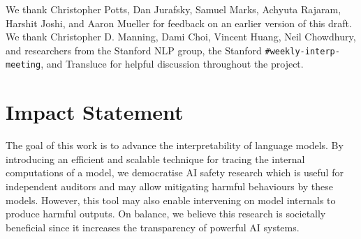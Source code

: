\documentclass{article}
\theoremstyle{plain}
\theoremstyle{definition}
\theoremstyle{remark}
\begin{document}
We thank Christopher Potts, Dan Jurafsky, Samuel Marks, Achyuta Rajaram, Harshit Joshi, and Aaron Mueller for feedback on an earlier version of this draft. We thank Christopher D. Manning, Dami Choi, Vincent Huang, Neil Chowdhury, and researchers from the Stanford NLP group, the Stanford \texttt{\#weekly-interp-meeting}, and Transluce for helpful discussion throughout the project.

\section*{Impact Statement}

The goal of this work is to advance the interpretability of language models. By introducing an efficient and scalable technique for tracing the internal computations of a model, we democratise AI safety research which is useful for independent auditors and may allow mitigating harmful behaviours by these models. However, this tool may also enable intervening on model internals to produce harmful outputs. On balance, we believe this research is societally beneficial since it increases the transparency of powerful AI systems.







\newpage
\clearpage
\appendix
\onecolumn
\end{document}
